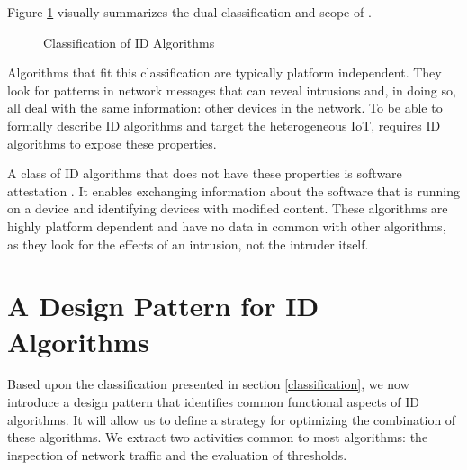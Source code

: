 \documentclass[conference]{IEEEtran}
\begin{document}
Figure \ref{fig:classification} visually summarizes the dual classification and
scope of \NAME.

\begin{figure}[ht]
  \centering
  \caption{Classification of ID Algorithms}
  \label{fig:classification}
\end{figure}

Algorithms that fit this classification are typically platform independent.
They look for patterns in network messages that can reveal intrusions and, in
doing so, all deal with the same information: other devices in the network. To
be able to formally describe ID algorithms and target the heterogeneous IoT,
\NAME requires ID algorithms to expose these properties.

A class of ID algorithms that does not have these properties is software
attestation \cite{seshadri2008sake}. It enables exchanging information about
the software that is running on a device and identifying devices with modified
content. These algorithms are highly platform dependent and have no data in
common with other algorithms, as they look for the effects of an intrusion, not
the intruder itself.

\section{A Design Pattern for ID Algorithms}
\label{pattern}

Based upon the classification presented in section \ref{classification}, we now
introduce a design pattern that identifies common functional aspects of ID
algorithms. It will allow us to define a strategy for optimizing the
combination of these algorithms. We extract two activities common to most
algorithms: the inspection of network traffic and the evaluation of thresholds.
\end{document}
